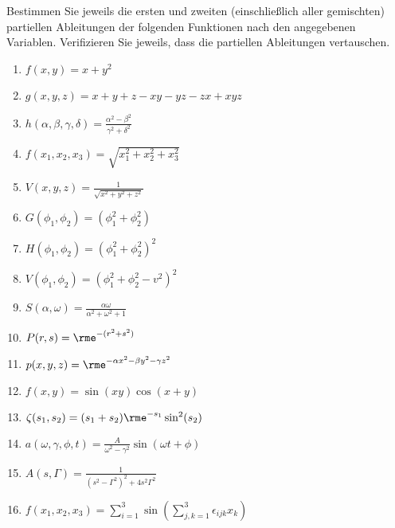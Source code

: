 Bestimmen Sie jeweils die ersten und zweiten (einschließlich aller gemischten)
partiellen Ableitungen der folgenden Funktionen nach den angegebenen Variablen.
Verifizieren Sie jeweils, dass die partiellen Ableitungen vertauschen.\\
\parbox{0.5\textwidth}{\begin{enumerate}
\item $f(x,y)=x+y^2$
\item $g(x,y,z)=x+y+z-xy-yz-zx+xyz$
\item $h(\alpha,\beta,\gamma,\delta)=\frac{\alpha^2-\beta^2}{\gamma^2+\delta^2}$
\item $f(x_1,x_2,x_3)=\sqrt{x_1^2+x_2^2+x_3^2}$
\item $V(x,y,z)=\frac{1}{\sqrt{x^2+y^2+z^2}}$
\item $G(\phi_1,\phi_2)=(\phi_1^2+\phi_2^2)$
\item $H(\phi_1,\phi_2)=(\phi_1^2+\phi_2^2)^2$
\item $V(\phi_1,\phi_2)=\left(\phi_1^2+\phi_2^2-v^2\right)^2$
\end{enumerate}}\parbox{0.5\textwidth}{\begin{enumerate}\setcounter{enumi}{8}
\item $S(\alpha,\omega)=\frac{\alpha\omega}{\alpha^2+\omega^2+1}$
\item $P(r,s)=\rme^{-(r^2+s^2)}$
\item $p(x,y,z)=\rme^{-\alpha x^2-\beta y^2-\gamma z^2}$
\item $f(x,y)=\sin(xy)\cos(x+y)$
\item $\zeta(s_1,s_2)=(s_1+s_2)\rme^{-s_1}\sin^2(s_2)$
\item $a(\omega,\gamma,\phi,t)=\frac{A}{\omega^2-\gamma^2}\sin(\omega t+\phi)$
\item $A(s,\Gamma)=\frac{1}{(s^2-\Gamma^2)^2+4s^2\Gamma^2}$
\item $f(x_1,x_2,x_3)=\sum_{i=1}^3\sin\left(\sum_{j,k=1}^3\epsilon_{ijk}x_k\right)$
\end{enumerate}}



\pagebreak



